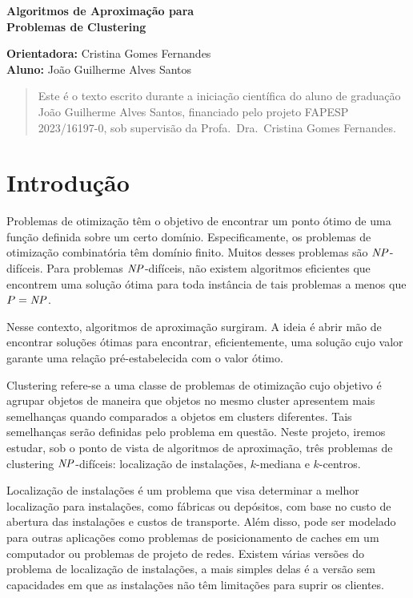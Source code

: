 \documentclass[12pt]{article}
\begin{document}
\begin{center}
  
{\Large {\bf Algoritmos de Aproximação para \\Problemas de Clustering}
}

\vspace{0.2cm}
{\small 
{\bf Orientadora:} Cristina Gomes Fernandes \\
{\bf Aluno:} João Guilherme Alves Santos
}

\vspace{5mm} 

\begin{abstract}
Este é o texto escrito durante a iniciação científica do aluno de graduação João Guilherme Alves Santos, financiado pelo projeto FAPESP 2023/16197-0, sob supervisão da Profa.\ Dra.\ Cristina Gomes Fernandes.
\end{abstract}

\end{center}
\newpage

\tableofcontents
\newpage

\section{Introdução}

Problemas de otimização têm o objetivo de encontrar um ponto ótimo de uma função definida sobre um certo domínio. Especificamente, os problemas de otimização combinatória têm domínio finito. Muitos desses problemas são $\mathit{NP}$-difíceis. Para problemas $\mathit{NP}$-difíceis, não existem algoritmos eficientes que encontrem uma solução ótima para toda instância de tais problemas a menos que $P = \mathit{NP}$.

Nesse contexto, algoritmos de aproximação surgiram. A ideia é abrir mão de encontrar soluções ótimas para encontrar, eficientemente, uma solução cujo valor garante uma relação pré-estabelecida com o valor ótimo. 

Clustering refere-se a uma classe de problemas de otimização cujo objetivo é agrupar objetos de maneira que objetos no mesmo cluster apresentem mais semelhanças quando comparados a objetos em clusters diferentes. Tais semelhanças serão definidas pelo problema em questão. Neste projeto, iremos estudar, sob o ponto de vista de algoritmos de aproximação, três problemas de clustering $\mathit{NP}$-difíceis: localização de instalações, $k$-mediana e $k$-centros. 

Localização de instalações é um problema que visa determinar a melhor localização para instalações, como fábricas ou depósitos, com base no custo de abertura das instalações e custos de transporte. Além disso, pode ser modelado para outras aplicações como problemas de posicionamento de caches em um computador ou problemas de projeto de redes.
Existem várias versões do problema de localização de instalações, a mais simples delas é a versão sem capacidades em que as instalações não têm limitações para suprir os clientes.
\end{document}
